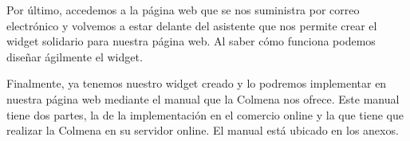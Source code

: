 

Por último, accedemos a la página web que se nos suministra por correo electrónico y volvemos a estar delante del asistente que nos permite crear el widget solidario para nuestra página web. Al saber cómo funciona podemos diseñar ágilmente el widget.


Finalmente, ya tenemos nuestro widget creado y lo podremos implementar en nuestra página web mediante el manual que la Colmena nos ofrece. Este manual tiene dos partes, la de la implementación en el comercio online y la que tiene que realizar la Colmena en su servidor online. El manual está ubicado en los anexos.
